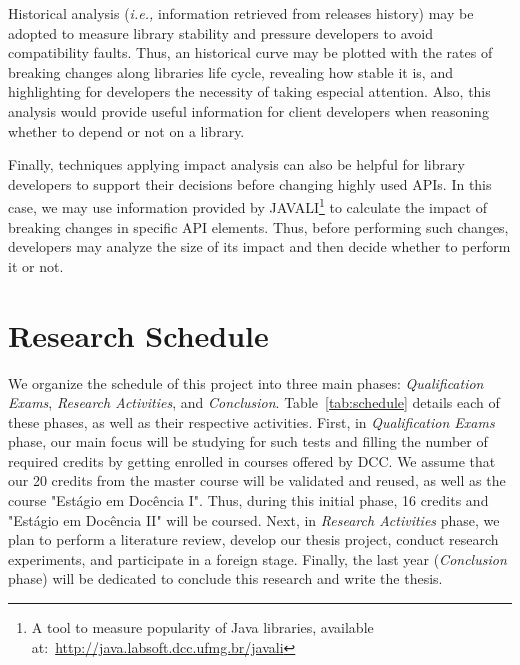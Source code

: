 \documentclass[11pt, a4paper]{article}
\newcommand{\ie}{\emph{i.e.,}\xspace}
\begin{document}
Historical analysis (\ie information retrieved from releases history)  may be adopted to measure library stability and pressure developers to avoid compatibility faults.
Thus, an historical curve may be plotted with the rates of breaking changes along libraries life cycle, revealing how stable it is, and highlighting for developers the necessity of taking especial attention.
Also, this analysis would provide useful information for client developers when reasoning whether to depend or not on a library. 

Finally, techniques applying impact analysis can also be helpful for library developers to support their decisions before changing highly used APIs.
In this case, we may use information provided by JAVALI\footnote{A tool to measure popularity of Java libraries, available at:~\url{http://java.labsoft.dcc.ufmg.br/javali}} to calculate the impact of breaking changes in specific API elements.
Thus, before performing such changes, developers may analyze the size of its impact and then decide whether to perform it or not.

\section{Research Schedule} 
\label{sec:schedule}

We organize the schedule of this project into three main phases: \emph{Qualification Exams}, \emph{Research Activities}, and \emph{Conclusion}.
Table~\ref{tab:schedule} details each of these phases, as well as their respective activities.
First, in \emph{Qualification Exams} phase, our main focus will be studying for such tests and filling the number of required credits by getting enrolled in courses offered by DCC.
We assume that our 20 credits from the master course will be validated and reused, as well as the course "Estágio em Docência I".
Thus, during this initial phase, 16 credits and "Estágio em Docência II" will be coursed.
Next, in \emph{Research Activities} phase, we plan to perform a literature review, develop our thesis project, conduct research experiments, and participate in a foreign stage.
Finally, the last year (\emph{Conclusion} phase) will be dedicated to conclude this research and write the thesis.
\end{document}
